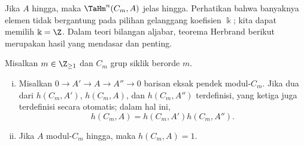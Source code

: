 Jika $A$ hingga, maka $\TaHm^n(C_m,A)$ jelas hingga. Perhatikan bahwa banyaknya
elemen tidak bergantung pada pilihan gelanggang koefisien $\Bbbk$; kita dapat
memilih $\Bbbk=\Z$. Dalam teori bilangan aljabar, teorema Herbrand berikut
merupakan hasil yang mendasar dan penting.

\begin{theorem}[J.\ Herbrand]
	Misalkan $m\in\Z_{\geq1}$ dan $C_m$ grup siklik berorde $m$.
	\begin{enumerate}[(i)]
		\item Misalkan $0\to A'\to A\to A''\to0$ barisan eksak pendek
		modul-$C_m$. Jika dua dari $h(C_m,A')$, $h(C_m,A)$, dan
		$h(C_m,A'')$ terdefinisi, yang ketiga juga terdefinisi secara otomatis;
		dalam hal ini,
		\[ h(C_m, A) = h(C_m, A') h(C_m, A''). \]
		\item Jika $A$ modul-$C_m$ hingga, maka $h(C_m,A)=1$.
	\end{enumerate}
\end{theorem}

